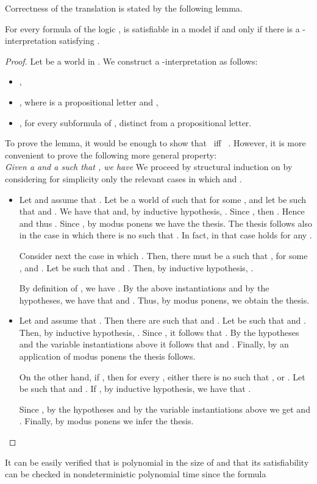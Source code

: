 \documentclass{fundam}
\begin{document}
Correctness of the translation is stated by the following lemma.
\begin{lemma}\label{leK45}
For every formula  of the logic ,  is
satisfiable in a model  if and only if
there is a
-interpretation satisfying .\end{lemma}
\begin{proof}
Let  be a world in .  We construct a
-interpretation  as follows:
\begin{itemize}
\item ,

\item , where  is a propositional letter and
,

\item , for every subformula  of
,
distinct from a propositional letter.
\end{itemize}
To prove the lemma, it would be enough to show that  ~iff~ .  However, it
is more convenient to prove the following more general property:\\
\indent \emph{Given a  and a  such that , we have
}
We proceed by structural induction on  by considering for
simplicity only the relevant cases in which 
and .
\begin{itemize}
\item Let  and assume that .  Let  be a world of  such that  for some , and let 
be such that  and .  We have that  and, by inductive hypothesis, .
Since , then .  Hence  and thus .  Since , by modus
ponens we have the thesis.  The thesis follows also in the case in
which there is no  such that .  In
fact, in that case  holds for any .

Consider next the case in which .
Then, there must be a  such that , for some , and .  Let
 be such that  and .
Then, by inductive hypothesis, .

By definition of , we have .  By the above instantiations and by the
hypotheses, we have that  and .  Thus, by modus ponens, we
obtain the thesis.

\item Let  and assume that .  Then there are  such that  and .  Let 
be such that  and .  Then, by inductive
hypothesis, .  Since , it follows that .  By the hypotheses and the variable instantiations above
it follows that  and .
Finally, by an application of modus ponens the thesis follows.

On the other hand, if , then for
every , either there is no  such that , or .  Let  be such that  and .  If , by inductive hypothesis, we have that .

Since , by the hypotheses and
by the variable instantiations above we get  and .  Finally,
by modus ponens we infer the thesis.
\end{itemize}
\end{proof}
It can be easily verified that  is polynomial in the
size of  and that its satisfiability can be checked in
nondeterministic polynomial time since the formula
\end{document}
